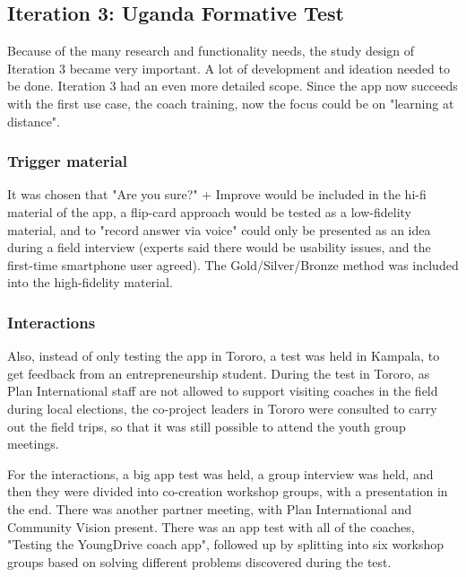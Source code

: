 \subsection{Iteration 3: Uganda Formative Test}

Because of the many research and functionality needs, the study design of Iteration 3 became very important. A lot of development and ideation needed to be done. Iteration 3 had an even more detailed scope. Since the app now succeeds with the first use case, the coach training, now the focus could be on "learning at distance".

\subsubsection{Trigger material}
It was chosen that "Are you sure?" + Improve would be included in the hi-fi material of the app, a flip-card approach would be tested as a low-fidelity material, and to "record answer via voice" could only be presented as an idea during a field interview (experts said there would be usability issues, and the first-time smartphone user agreed). The Gold/Silver/Bronze method was included into the high-fidelity material.

\subsubsection{Interactions}
Also, instead of only testing the app in Tororo, a test was held in Kampala, to get feedback from an entrepreneurship student. During the test in Tororo, as Plan International staff are not allowed to support visiting coaches in the field during local elections, the co-project leaders in Tororo were consulted to carry out the field trips, so that it was still possible to attend the youth group meetings.

For the interactions, a big app test was held, a group interview was held, and then they were divided into co-creation workshop groups, with a presentation in the end. There was another partner meeting, with Plan International and Community Vision present. There was an app test with all of the coaches, "Testing the YoungDrive coach app", followed up by splitting into six workshop groups based on solving different problems discovered during the test.



